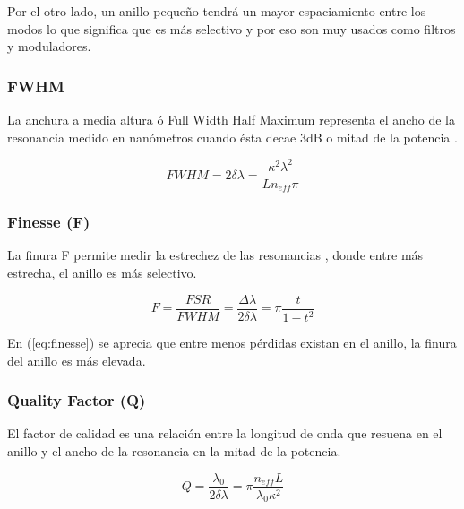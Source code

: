 Por el otro lado, un anillo pequeño tendrá un mayor espaciamiento
entre los modos lo que significa que es más selectivo \cite{chan2011physical} y por
eso son muy usados como filtros y moduladores.

\subsubsection{FWHM}

La anchura a media altura ó Full Width Half Maximum representa el ancho de la resonancia
medido en nanómetros cuando ésta decae 3dB o mitad de la potencia \cite{boeck2010series}.

\begin{equation}
FWHM=2\delta \lambda=\frac{\kappa^2 \lambda^2}{L n_{eff} \pi}
\label{eq:fwhm}
\end{equation} 

\subsubsection{Finesse (F)}

La finura F permite medir la estrechez de las resonancias \cite{blasco2011desarrollo},
donde entre más estrecha, el anillo es más selectivo.

\begin{equation}
F=\frac{FSR}{FWHM}=\frac{\Delta \lambda}{2 \delta \lambda} = \pi \frac{t}{1-t^2}
\label{eq:finesse}
\end{equation} 

En (\ref{eq:finesse}) se aprecia que entre menos pérdidas existan en el anillo, 
la finura del anillo es más elevada.

\subsubsection{Quality Factor (Q)}

El factor de calidad es una relación entre la longitud de onda que resuena en el 
anillo y el ancho de la resonancia en la mitad de la potencia.

\begin{equation}
Q = \frac{\lambda_0}{2 \delta \lambda} = \pi \frac{n_{eff} L}{\lambda_0 \kappa^2}
\label{eq:q}
\end{equation} 
